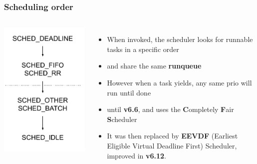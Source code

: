 \begin{frame}
	\frametitle{Scheduling order}
	\begin{columns}
		\includegraphics[width=\textwidth]{slides/realtime-linux-configuration/sched_precedence.pdf}
		\begin{itemize}
			\item When invoked, the scheduler looks for runnable tasks in a specific order
			\item {} and  share the same \textbf{runqueue}
			\item However when a  task yields, any same prio  will run until done
			\item until \textbf{v6.6},  and  uses the \textbf{C}ompletely \textbf{F}air \textbf{S}cheduler
			\item It was then replaced by \textbf{EEVDF} (Earliest Eligible Virtual Deadline First) Scheduler, improved in \textbf{v6.12}.
		\end{itemize}
	\end{columns}
\end{frame}

